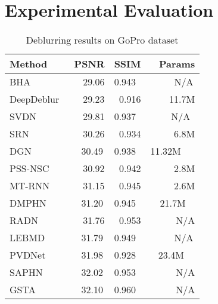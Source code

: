 \documentclass{article}
\begin{document}
\section{Experimental Evaluation}
\begin{table} \scriptsize
\centering
\caption{Deblurring results on GoPro dataset}
\label{tab:results_gopro}
\begin{tabular}{lrrr} 
\toprule
Method        & PSNR                        & SSIM                      & Params                         \\ 
\midrule
BHA~\cite{pan2019bringing}        & \multicolumn{1}{l}{~~29.06} & \multicolumn{1}{l}{0.943} & \multicolumn{1}{l}{~ ~ ~ N/A}  \\
DeepDeblur~\cite{nah2017deep}   & 29.23                       & 0.916                     & 11.7M                          \\
SVDN~\cite{yuan2020efficient}         & \multicolumn{1}{l}{~~29.81} & \multicolumn{1}{l}{0.937} & \multicolumn{1}{l}{~ ~ ~N/A}   \\
SRN~\cite{tao2018scale}          & 30.26                       & 0.934                     & 6.8M                           \\
DGN~\cite{DGN}           & \multicolumn{1}{l}{~ 30.49} & \multicolumn{1}{l}{0.938} & \multicolumn{1}{l}{11.32M}     \\
PSS-NSC~\cite{gao2019dynamic}      & 30.92                       & 0.942                     & 2.8M                           \\
MT-RNN~\cite{park2020multi}       & 31.15                       & 0.945                     & 2.6M                           \\
DMPHN~\cite{zhang2019deep}      & \multicolumn{1}{l}{~ 31.20} & \multicolumn{1}{l}{0.945} & \multicolumn{1}{l}{~~21.7M}    \\
RADN~\cite{purohit2020region}         & 31.76                       & 0.953                     & N/A                            \\
LEBMD~\cite{jiang2020learning}      & \multicolumn{1}{l}{~ 31.79} & \multicolumn{1}{l}{0.949} & \multicolumn{1}{l}{~ ~ ~ N/A}  \\
PVDNet~\cite{PVDNet}        & \multicolumn{1}{l}{~ 31.98} & \multicolumn{1}{l}{0.928} & \multicolumn{1}{l}{~ 23.4M}    \\
SAPHN~\cite{suin2020spatially}       & \multicolumn{1}{l}{~ 32.02} & \multicolumn{1}{l}{0.953} & \multicolumn{1}{l}{~ ~ ~~N/A}  \\
GSTA~\cite{GSTA}          & \multicolumn{1}{l}{~ 32.10} & \multicolumn{1}{l}{0.960} & \multicolumn{1}{l}{~ ~ ~~N/A}  \\

\end{tabular}
\end{table}
\end{document}
